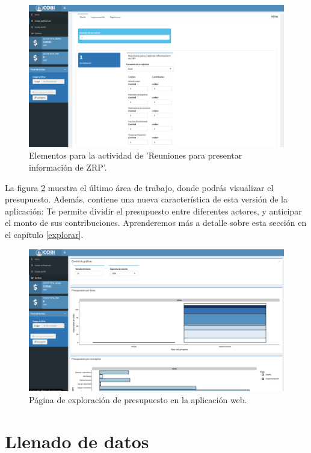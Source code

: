\documentclass[
]{book}
\begin{document}
\begin{figure}
\includegraphics[width=49.67in]{images/Screen Shot 2022-07-25 at 3.08.10 PM} \caption{Elementos para la actividad de 'Reuniones para presentar información de ZRP'.}\label{fig:elements}
\end{figure}

La figura \ref{fig:viewing-page} muestra el último área de trabajo, donde podrás visualizar el presupuesto. Además, contiene una nueva característica de esta versión de la aplicación: Te permite dividir el presupuesto entre diferentes actores, y anticipar el monto de sus contribuciones. Aprenderemos más a detalle sobre esta sección en el capítulo \ref{explorar}.

\begin{figure}
\includegraphics[width=49.67in]{images/Screen Shot 2022-07-25 at 2.56.18 PM} \caption{Página de exploración de presupuesto en la aplicación web.}\label{fig:viewing-page}
\end{figure}

\hypertarget{llenado}{%
\chapter{Llenado de datos}\label{llenado}}
\end{document}
